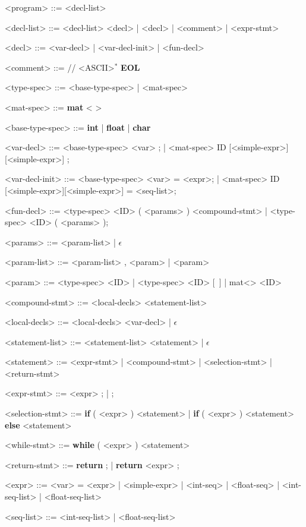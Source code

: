\begin{grammar}
	<program> ::= <decl-list>

	<decl-list> ::= <decl-list> <decl> | <decl> | <comment> | <expr-stmt>
	
	<decl> ::= <var-decl> | <var-decl-init> | <fun-decl>
	
	<comment> ::= // <ASCII>$^*$ \textbf{EOL}

	<type-spec> ::= <base-type-spec> | <mat-spec>
	
	<mat-spec> ::= \textbf{mat} \textless <base-type-spec> \textgreater 

	<base-type-spec> ::= \textbf{int} | \textbf{float} | \textbf{char}

	<var-decl> ::= <base-type-spec> <var> ; | <mat-spec> ID [<simple-expr>][<simple-expr>] ;
	
	<var-decl-init> ::= <base-type-spec> <var> = <expr>; | <mat-spec> ID [<simple-expr>][<simple-expr>] = {<seq-list>};
	
	<fun-decl> ::= <type-spec> <ID> ( <params> ) <compound-stmt> | <type-spec> <ID> ( <params> );
	
	<params> ::= <param-list> | $\epsilon$
	
	<param-list> ::= <param-list> , <param> | <param> 
	
	<param> ::= <type-spec> <ID> | <type-spec> <ID> $[$\ $]$ | mat\textless<type-spec-base>> <ID> 
	
	<compound-stmt> ::= { <local-decls> <statement-list> } 
	
	<local-decls> ::= <local-decls> <var-decl> | $\epsilon$ 
	
	<statement-list> ::= <statement-list> <statement> | $\epsilon$
	
	<statement> ::= <expr-stmt> | <compound-stmt> | <selection-stmt> \alt <while-stmt> | <return-stmt> 
	
	<expr-stmt> ::= <expr> ; | ; 
	
	<selection-stmt> ::= \textbf{if} ( <expr> ) <statement> | \textbf{if} ( <expr> ) <statement> \textbf{else} <statement> 
	
	<while-stmt> ::= \textbf{while} ( <expr> ) <statement> 
	
	<return-stmt> ::= \textbf{return} ; | \textbf{return} <expr> ;
	
	<expr> ::= <var> = <expr> | <simple-expr> | {<int-seq>} | {<float-seq>} | {<int-seq-list>} | {<float-seq-list>}
	
	<seq-list> ::= <int-seq-list> | <float-seq-list>


\end{grammar}
